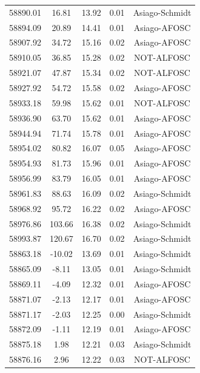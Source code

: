 \begin{longtable}{|c|c|c|c|c|}
 58890.01 &   16.81 &       13.92 &          0.01 & Asiago-Schmidt \\
 58894.09 &   20.89 &       14.41 &          0.01 & Asiago-AFOSC  \\
 58907.92 &   34.72 &       15.16 &          0.02 & Asiago-AFOSC  \\
 58910.05 &   36.85 &       15.28 &          0.02 & NOT-ALFOSC   \\
 58921.07 &   47.87 &       15.34 &          0.02 & NOT-ALFOSC   \\
 58927.92 &   54.72 &       15.58 &          0.02 & Asiago-AFOSC  \\
 58933.18 &   59.98 &       15.62 &          0.01 & NOT-ALFOSC   \\
 58936.90 &   63.70 &       15.62 &          0.01 & Asiago-AFOSC  \\
 58944.94 &   71.74 &       15.78 &          0.01 & Asiago-AFOSC  \\
 58954.02 &   80.82 &       16.07 &          0.05 & Asiago-AFOSC  \\
 58954.93 &   81.73 &       15.96 &          0.01 & Asiago-AFOSC  \\
 58956.99 &   83.79 &       16.05 &          0.01 & Asiago-AFOSC  \\
 58961.83 &   88.63 &       16.09 &          0.02 & Asiago-Schmidt \\
 58968.92 &   95.72 &       16.22 &          0.02 & Asiago-AFOSC  \\
 58976.86 &  103.66 &       16.38 &          0.02 & Asiago-Schmidt \\
 58993.87 &  120.67 &       16.70 &          0.02 & Asiago-Schmidt \\
 58863.18 &  -10.02 &       13.69 &          0.01 & Asiago-Schmidt \\
 58865.09 &   -8.11 &       13.05 &          0.01 & Asiago-Schmidt \\
 58869.11 &   -4.09 &       12.32 &          0.01 & Asiago-AFOSC  \\
 58871.07 &   -2.13 &       12.17 &          0.01 & Asiago-AFOSC  \\
 58871.17 &   -2.03 &       12.25 &          0.00 & Asiago-Schmidt \\
 58872.09 &   -1.11 &       12.19 &          0.01 & Asiago-AFOSC    \\
 58875.18 &    1.98 &       12.21 &          0.03 & Asiago-Schmidt \\
 58876.16 &    2.96 &       12.22 &          0.03 & NOT-ALFOSC   \\

\end{longtable}
